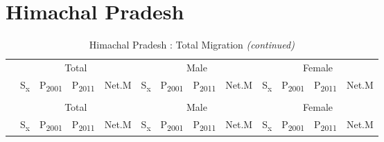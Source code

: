 \documentclass[
  12pt,
]{article}
\begin{document}
\pagebreak

\hypertarget{himachal-pradesh}{%
\section{Himachal Pradesh}\label{himachal-pradesh}}

\begingroup\fontsize{9.7}{11.7}\selectfont

\begin{longtable}[t]{lcccccccccccc}
\caption{\label{tab:unnamed-chunk-5}Himachal Pradesh : Total Migration}\\
\toprule
\multicolumn{1}{c}{ } & \multicolumn{4}{c}{Total} & \multicolumn{4}{c}{Male} & \multicolumn{4}{c}{Female} \\
\cmidrule(l{3pt}r{3pt}){2-5} \cmidrule(l{3pt}r{3pt}){6-9} \cmidrule(l{3pt}r{3pt}){10-13}
  & S\textsubscript{x} & P\textsubscript{2001} & P\textsubscript{2011} & Net.M & S\textsubscript{x} & P\textsubscript{2001} & P\textsubscript{2011} & Net.M & S\textsubscript{x} & P\textsubscript{2001} & P\textsubscript{2011} & Net.M\\
\midrule
\endfirsthead
\caption[]{Himachal Pradesh : Total Migration \textit{(continued)}}\\
\toprule
\multicolumn{1}{c}{ } & \multicolumn{4}{c}{Total} & \multicolumn{4}{c}{Male} & \multicolumn{4}{c}{Female} \\
\cmidrule(l{3pt}r{3pt}){2-5} \cmidrule(l{3pt}r{3pt}){6-9} \cmidrule(l{3pt}r{3pt}){10-13}
  & S\textsubscript{x} & P\textsubscript{2001} & P\textsubscript{2011} & Net.M & S\textsubscript{x} & P\textsubscript{2001} & P\textsubscript{2011} & Net.M & S\textsubscript{x} & P\textsubscript{2001} & P\textsubscript{2011} & Net.M\\
\midrule
\endhead


\end{longtable}
\end{document}
